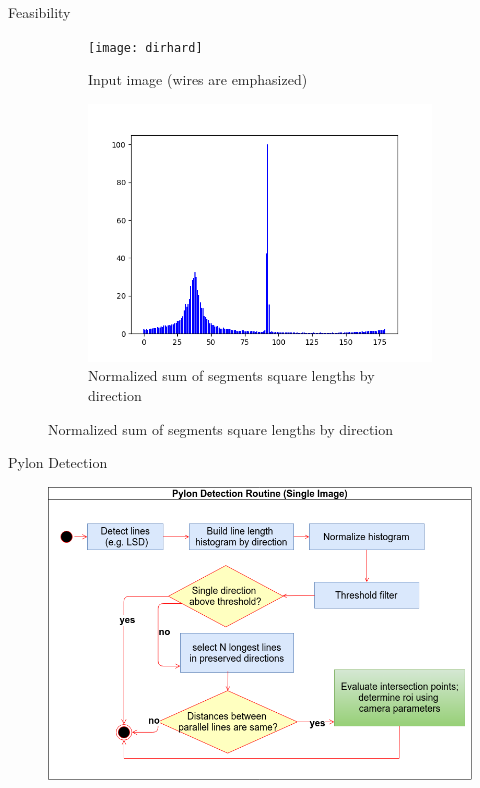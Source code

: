 \documentclass{beamer}
\begin{document}
\begin{frame}[t, fragile]{Feasibility}

\begin{figure}[H!]
\centering
\begin{subfigure}{.5\textwidth}
\centering
\texttt{[image: dirhard]}
\caption{Input image (wires are emphasized)}
\end{subfigure}%
\begin{subfigure}{.5\textwidth}
\centering
\includegraphics[width=1\linewidth]{dirhisthard}
\caption{Normalized sum of segments square lengths by direction}
\end{subfigure}
\end{figure}
\end{frame}



\begin{frame}[t, fragile]{Pylon Detection}
\begin{figure}
\centering
\includegraphics[scale=0.33]{DetectionSimple}
\end{figure}
\end{frame}
\end{document}
